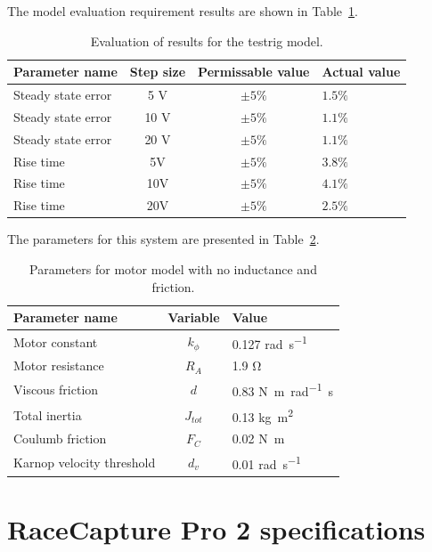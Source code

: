 The model evaluation requirement results are shown in Table~\ref{table:evaluationreqs}.
\begin{table}[H]
\caption{Evaluation of results for the testrig model.}
\label{table:evaluationreqs}
\begin{center}
\begin{tabular}{lccl}
\textbf{Parameter name} & \textbf{Step size} & \textbf{Permissable value} & \textbf{Actual value}\\
\toprule
Steady state error & 5 V & $\pm5\si{\percent}$ & $1.5\si{\percent}$\\
Steady state error & 10 V & $\pm5\si{\percent}$ & $1.1\si{\percent}$\\
Steady state error & 20 V & $\pm5\si{\percent}$ & $1.1\si{\percent}$\\
Rise time & 5V & $\pm5\si{\percent}$ & $3.8\si{\percent}$ \\
Rise time & 10V & $\pm5\si{\percent}$ & $4.1\si{\percent}$ \\
Rise time & 20V & $\pm5\si{\percent}$ & $2.5\si{\percent}$ \\
\bottomrule
\end{tabular}
\end{center}
\end{table}



The parameters for this system are presented in Table~\ref{table:model2table}.
\begin{table}[H]
\caption{Parameters for motor model with no inductance and friction.}
\label{table:model2table}
\begin{center}
\begin{tabular}{lcl}
\textbf{Parameter name} & \textbf{Variable} & \textbf{Value}\\
\toprule
Motor constant & $k_{\phi}$ & 0.127 \si{\radian\per\second} \\
Motor resistance & $R_A$ & 1.9 \si{\ohm} \\
Viscous friction & $d$ & 0.83 \si{\newton\meter\per\radian\second} \\
Total inertia & $J_{tot}$ & 0.13 \si{\kilogram\meter^{2}} \\
Coulumb friction & $F_C$ & 0.02 \si{\newton\meter} \\
Karnop velocity threshold & $d_v$ & 0.01 \si{\radian\per\second} \\
\bottomrule
\end{tabular}
\end{center}
\end{table}











\chapter{RaceCapture Pro 2 specifications}\label{app:RCP}

